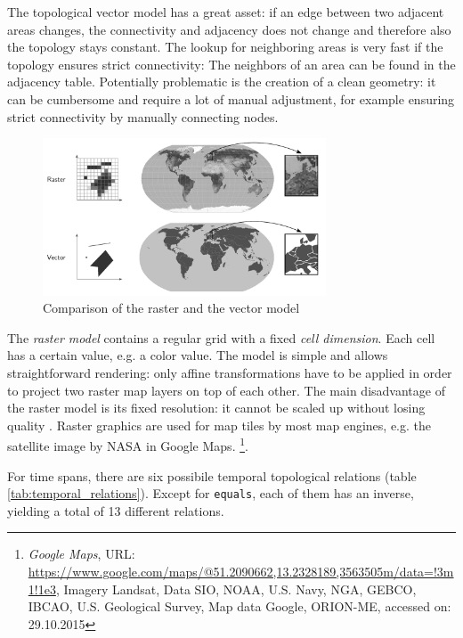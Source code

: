 The topological vector model has a great asset: if an edge between two adjacent areas changes, the connectivity and adjacency does not change and therefore also the topology stays constant. The lookup for neighboring areas is very fast if the topology ensures strict connectivity: The neighbors of an area can be found in the adjacency table. Potentially problematic is the creation of a clean geometry: it can be cumbersome and require a lot of manual adjustment, for example ensuring strict connectivity by manually connecting nodes.




\begin{figure}[H]
  \centering
  \includegraphics[width=0.75\textwidth]{graphics/basics/hgis/raster_vector}
  \caption{Comparison of the raster and the vector model}
  \label{fig:raster_vector}
\end{figure}

The \emph{raster model} contains a regular grid with a fixed \emph{cell dimension}. Each cell has a certain value, e.g. a color value.
The model is simple and allows straightforward rendering: only affine transformations have to be applied in order to project two raster map layers on top of each other. The main disadvantage of the raster model is its fixed resolution: it cannot be scaled up without losing quality
\cite[pp.42-48]{bolstad2008gis}.
Raster graphics are used for map tiles by most map engines, e.g. the satellite image by NASA in Google Maps.
\footnote{
  \emph{Google Maps},
  URL: \url{https://www.google.com/maps/@51.2090662,13.2328189,3563505m/data=!3m1!1e3},
  Imagery  Landsat, Data SIO, NOAA, U.S. Navy, NGA, GEBCO, IBCAO, U.S. Geological Survey, Map data  Google, ORION-ME,
  accessed on: 29.10.2015
}.


For time spans, there are six possibile temporal topological relations (table \ref{tab:temporal_relations}). Except for \texttt{equals}, each of them has an inverse, yielding a total of 13 different relations.

